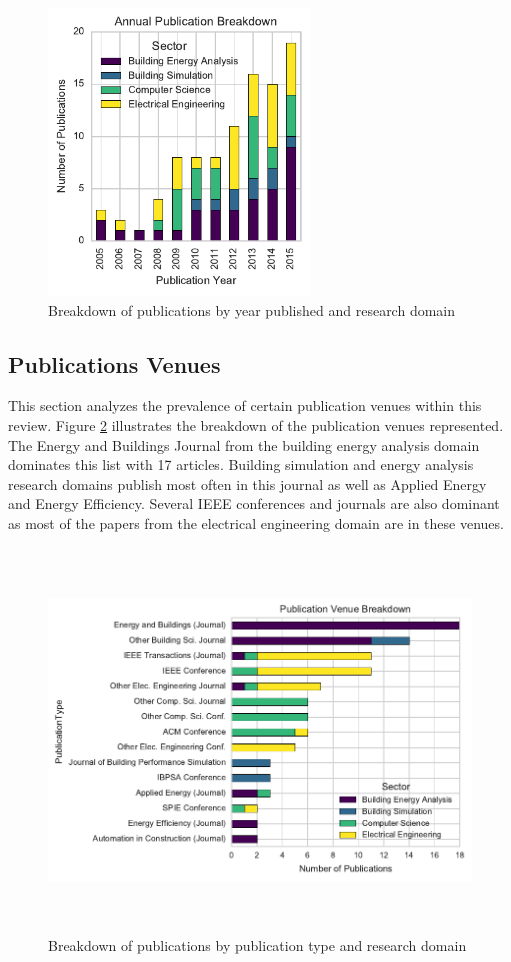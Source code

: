 \documentclass[preprint,12pt,3p]{elsarticle}
\begin{document}
\begin{figure}[H]
\centering
\includegraphics[height=3in]{./Data/PublicationYear}
\caption{Breakdown of publications by year published and research domain}
\label{fig:yearbreakdown}
\end{figure}

\subsection{Publications Venues}
This section analyzes the prevalence of certain publication venues within this review. Figure \ref{fig:journalbreakdown} illustrates the breakdown of the publication venues represented. The Energy and Buildings Journal from the building energy analysis domain dominates this list with 17 articles. Building simulation and energy analysis research domains publish most often in this journal as well as Applied Energy and Energy Efficiency. Several IEEE conferences and journals are also dominant as most of the papers from the electrical engineering domain are in these venues.

\begin{figure}[H]
\centering
\includegraphics[height=4in]{./Data/PublicationVenues}
\caption{Breakdown of publications by publication type and research domain}
\label{fig:journalbreakdown}
\end{figure}
\end{document}
